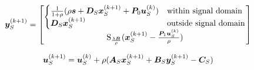 \documentclass{article}
\begin{document}
\begin{equation}
\bm{y}_S^{(k + 1)} = \begin{bmatrix}
\begin{cases}
\frac{1}{1 + \rho}(\rho\bm{s} + \bm{D}_S\bm{x}_S^{(k + 1)} + \bm{P}_0\bm{u}_S^{(k)}) & \text{within signal domain}\\
\bm{D}_S\bm{x}_S^{(k + 1)} & \text{outside signal domain}
\end{cases} \\
\operatorname{S}_{\frac{\lambda\bm{R}}{\rho}}(\bm{x}_S^{(k+1)} - \frac{\bm{P}_1\bm{u}_S^{(k)}}{\rho})
\end{bmatrix}
\end{equation}


\begin{equation}
\bm{u}_S^{(k + 1)} = \bm{u}_S^{(k)} + \rho(\bm{A}_S\bm{x}_S^{(k + 1)} + \bm{B}_S\bm{y}_S^{(k + 1)} - \bm{C}_S)
\end{equation}
\end{document}
